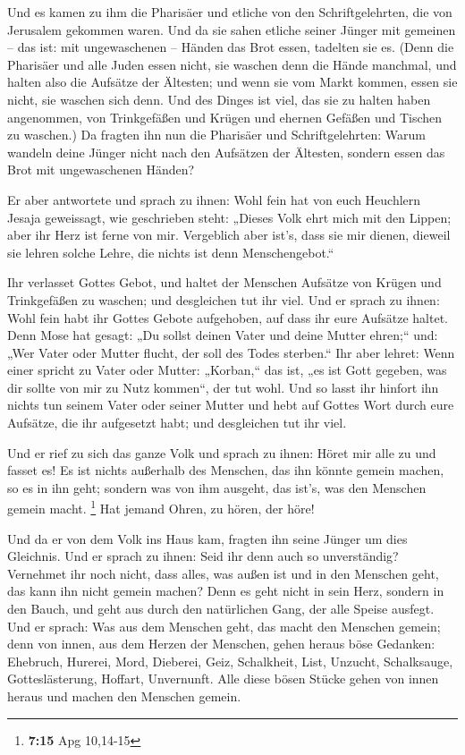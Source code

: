  Und es kamen zu ihm die Pharisäer und etliche von den
Schriftgelehrten, die von Jerusalem gekommen waren.  Und da
sie sahen etliche seiner Jünger mit gemeinen -- das ist: mit
ungewaschenen -- Händen das Brot essen, tadelten sie es. 
(Denn die Pharisäer und alle Juden essen nicht, sie waschen denn die
Hände manchmal, und halten also die Aufsätze der Ältesten; 
und wenn sie vom Markt kommen, essen sie nicht, sie waschen sich denn.
Und des Dinges ist viel, das sie zu halten haben angenommen, von
Trinkgefäßen und Krügen und ehernen Gefäßen und Tischen zu waschen.)
 Da fragten ihn nun die Pharisäer und Schriftgelehrten:
Warum wandeln deine Jünger nicht nach den Aufsätzen der Ältesten,
sondern essen das Brot mit ungewaschenen Händen?

 Er aber antwortete und sprach zu ihnen: Wohl fein hat von
euch Heuchlern Jesaja geweissagt, wie geschrieben steht: „Dieses Volk
ehrt mich mit den Lippen; aber ihr Herz ist ferne von mir. 
Vergeblich aber ist's, dass sie mir dienen, dieweil sie lehren solche
Lehre, die nichts ist denn Menschengebot.``

 Ihr verlasset Gottes Gebot, und haltet der Menschen
Aufsätze von Krügen und Trinkgefäßen zu waschen; und desgleichen tut ihr
viel.  Und er sprach zu ihnen: Wohl fein habt ihr Gottes
Gebote aufgehoben, auf dass ihr eure Aufsätze haltet.  Denn
Mose hat gesagt: „Du sollst deinen Vater und deine Mutter ehren;`` und:
„Wer Vater oder Mutter flucht, der soll des Todes sterben.``
 Ihr aber lehret: Wenn einer spricht zu Vater oder Mutter:
„Korban,`` das ist, „es ist Gott gegeben, was dir sollte von mir zu Nutz
kommen``, der tut wohl.  Und so lasst ihr hinfort ihn
nichts tun seinem Vater oder seiner Mutter  und hebt auf
Gottes Wort durch eure Aufsätze, die ihr aufgesetzt habt; und
desgleichen tut ihr viel.

 Und er rief zu sich das ganze Volk und sprach zu ihnen:
Höret mir alle zu und fasset es!  Es ist nichts außerhalb
des Menschen, das ihn könnte gemein machen, so es in ihn geht; sondern
was von ihm ausgeht, das ist's, was den Menschen gemein macht.
\footnote{\textbf{7:15} Apg 10,14-15}  Hat jemand Ohren, zu
hören, der höre!

 Und da er von dem Volk ins Haus kam, fragten ihn seine
Jünger um dies Gleichnis.  Und er sprach zu ihnen: Seid ihr
denn auch so unverständig? Vernehmet ihr noch nicht, dass alles, was
außen ist und in den Menschen geht, das kann ihn nicht gemein machen?
 Denn es geht nicht in sein Herz, sondern in den Bauch, und
geht aus durch den natürlichen Gang, der alle Speise ausfegt.
 Und er sprach: Was aus dem Menschen geht, das macht den
Menschen gemein;  denn von innen, aus dem Herzen der
Menschen, gehen heraus böse Gedanken: Ehebruch, Hurerei, Mord,
 Dieberei, Geiz, Schalkheit, List, Unzucht, Schalksauge,
Gotteslästerung, Hoffart, Unvernunft.  Alle diese bösen
Stücke gehen von innen heraus und machen den Menschen gemein.

